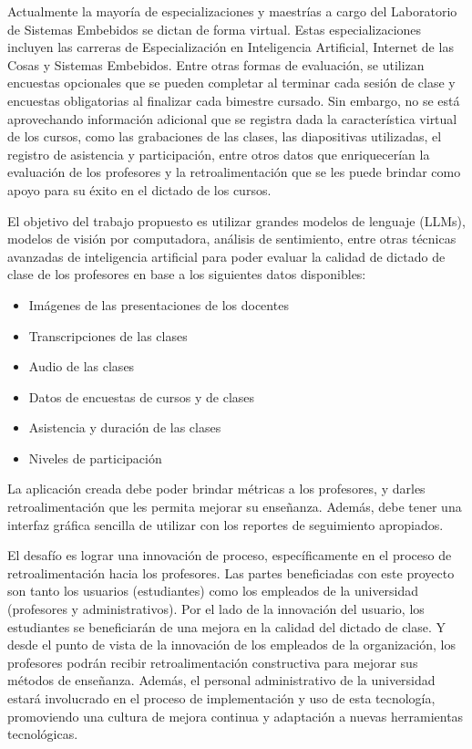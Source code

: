 \documentclass[
11pt, %
codirector, %
]{charter}
\begin{document}
Actualmente la mayoría de especializaciones y maestrías a cargo del Laboratorio de Sistemas Embebidos se dictan de forma virtual. Estas especializaciones incluyen las carreras de Especialización en Inteligencia Artificial, Internet de las Cosas y Sistemas Embebidos. Entre otras formas de evaluación, se utilizan encuestas opcionales que se pueden completar al terminar cada sesión de clase y encuestas obligatorias al finalizar cada bimestre cursado. Sin embargo, no se está aprovechando información adicional que se registra dada la característica virtual de los cursos, como las grabaciones de las clases, las diapositivas utilizadas, el registro de asistencia y participación, entre otros datos que enriquecerían la evaluación de los profesores y la retroalimentación que se les puede brindar como apoyo para su éxito en el dictado de los cursos.

El objetivo del trabajo propuesto es utilizar grandes modelos de lenguaje (LLMs), modelos de visión por computadora, análisis de sentimiento, entre otras técnicas avanzadas de inteligencia artificial para poder evaluar la calidad de dictado de clase de los profesores en base a los siguientes datos disponibles:
\begin{itemize}
    \item Imágenes de las presentaciones de los docentes
    \item Transcripciones de las clases
    \item Audio de las clases
    \item Datos de encuestas de cursos y de clases
    \item Asistencia y duración de las clases
    \item Niveles de participación
\end{itemize}

La aplicación creada debe poder brindar métricas a los profesores, y darles retroalimentación que les permita mejorar su enseñanza. Además, debe tener una interfaz gráfica sencilla de utilizar con los reportes de seguimiento apropiados.

El desafío es lograr una innovación de proceso, específicamente en el proceso de retroalimentación hacia los profesores. Las partes beneficiadas con este proyecto son tanto los usuarios (estudiantes) como los empleados de la universidad (profesores y administrativos). Por el lado de la innovación del usuario, los estudiantes se beneficiarán de una mejora en la calidad del dictado de clase. Y desde el punto de vista de la innovación de los empleados de la organización, los profesores podrán recibir retroalimentación constructiva para mejorar sus métodos de enseñanza. Además, el personal administrativo de la universidad estará involucrado en el proceso de implementación y uso de esta tecnología, promoviendo una cultura de mejora continua y adaptación a nuevas herramientas tecnológicas.
\end{document}
